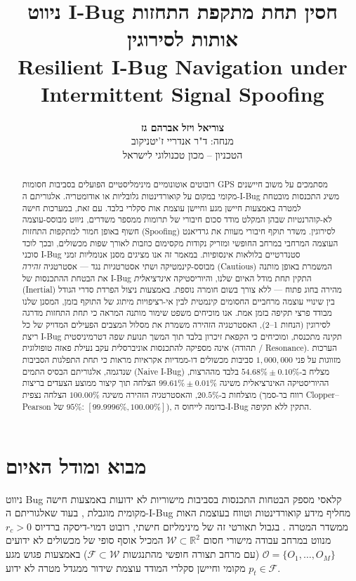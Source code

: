 \documentclass[10pt, a4paper, twocolumn]{article}
\title{\vspace{-1.2em}\Large\textbf{ניווט \foreignlanguage{english}{I-Bug} חסין תחת מתקפת התחזות אותות לסירוגין}\\
\normalsize\foreignlanguage{english}{\textbf{Resilient I-Bug Navigation under Intermittent Signal Spoofing}}}
\author{
  \textbf{צוריאל ויזל} \quad \textbf{אברהם גז} \\
  \small מנחה: ד"ר אנדריי ז'יטניקוב \\
  \small הטכניון -- מכון טכנולוגי לישראל \\
  \vspace{-1.2em}
}
\date{}
\begin{document}
\maketitle

\begin{abstract}
\noindent
רובוטים אוטונומיים מינימליסטיים הפועלים בסביבות חסומות \foreignlanguage{english}{GPS} מסתמכים על משוב חיישנים מקומי במקום על קואורדינטות גלובליות או אודומטריה. אלגוריתם ה-\foreignlanguage{english}{I-Bug} משיג התכנסות מובטחת למטרה באמצעות חיישן מגע וחיישן עוצמת אות סקלרי בלבד. עם זאת, במערכות חישה לא-קוהרנטיות שבהן המקלט מודד סכום חיבורי של תרומות ממספר משדרים, ניווט מבוסס-עוצמה חשוף באופן חמור למתקפות התחזות (\foreignlanguage{english}{Spoofing}) לסירוגין. משדר תוקף חיבורי מעוות את גרדיאנט העוצמה המרחבי במרחב החופשי ומזריק נקודות מקסימום כוזבות לאורך שפות מכשולים, ובכך לוכד סוכני \foreignlanguage{english}{I-Bug} סטנדרטיים בלולאות אינסופיות. במאמר זה אנו מציגים מסנן אנומליות זמני מבוסס-קינמטיקה ושתי אסטרטגיות נגד — אסטרטגיה \textit{זהירה} (\foreignlanguage{english}{Cautious}) המשמרת באופן מותנה את הבטחת ההתכנסות של \foreignlanguage{english}{I-Bug} התקין תחת מודל האיום שלנו, והיוריסטיקה \textit{אינרציאלית} (\foreignlanguage{english}{Inertial}) מהירה בחוג פתוח — ללא צורך בשום חומרה נוספת. באמצעות ניצול הפרדת סדרי הגודל בין שינויי עוצמה מרחביים החסומים קינמטית לבין אי-רציפויות מיתוג של התוקף בזמן, המסנן שלנו מבודד פרצי תקיפה בזמן אמת. אנו מוכיחים משפט שימור מותנה המראה כי תחת התחזות מדרגה לסירוגין (הנחות 1–2), האסטרטגיה הזהירה משמרת את מסלול המצבים הפעילים המדויק של כל ריצת \foreignlanguage{english}{I-Bug} תקינה מתכנסת, ומוכיחים כי הקפאת זיכרון בלבד תוך המשך תנועת שפה דטרמיניסטית אינה מספיקה להתכנסות אוניברסלית עקב נעילת פאזה טופולוגית (תהודה / \foreignlanguage{english}{Resonance}). הערכות מזווגות על פני $1,000,000$ סביבות מכשולים דו-ממדיות אקראיות מראות כי תחת התפלגות הסביבות שנדגמה, אלגוריתם הבסיס התמים (\foreignlanguage{english}{Naive I-Bug}) מצליח ב-$54.68\% \pm 0.10\%$ בלבד מההרצות, ההיוריסטיקה האינרציאלית משיגה $99.61\% \pm 0.01\%$ הצלחה תוך קיצור ממוצע הצעדים בריצות מוצלחות ב-$20.5\%$, והאסטרטגיה הזהירה משיגה $100.00\%$ הצלחה נצפית (רווח בר-סמך \foreignlanguage{english}{Clopper--Pearson} של $95\%$: $[99.9996\%, 100.00\%]$), בדומה לייחוס ה-\foreignlanguage{english}{I-Bug} התקין ללא תקיפה.
\end{abstract}

\section{מבוא ומודל האיום}
ניווט \foreignlanguage{english}{Bug} קלאסי מספק הבטחות התכנסות בסביבות מישוריות לא ידועות באמצעות חישה מקומית מוגבלת \cite{lumelsky1987path, kamon1998tangentbug}, בעוד שאלגוריתם ה-\foreignlanguage{english}{I-Bug} מחליף מידע קואורדינטות וטווח בעוצמת האות ממשדר המטרה \cite{taylor2009ibug, taylor2014intensity}. בגבול תאורטי זה של מינימליזם חישתי, רובוט דמוי-דיסקה ברדיוס $r_c > 0$ מנווט במרחב עבודה מישורי חסום $\mathcal{W} \subset \mathbb{R}^2$ המכיל אוסף סופי של מכשולים לא ידועים $\mathcal{O} = \{O_1, \dots, O_M\}$ (עם מרחב תצורה חופשי מהתנגשות $\mathcal{F} \subset \mathcal{W}$) באמצעות פגוש מגע מקומי וחיישן סקלרי המודד עוצמת שידור ממגדל מטרה לא ידוע $p_t \in \mathcal{F}$.
\end{document}
